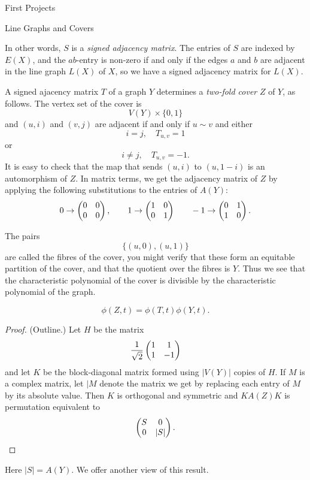 \begin{chap}{First Projects}
\begin{sect}{Line Graphs and Covers}
\begin{para}
In other words, $S$ is a \textsl{signed adjacency matrix}. The entries of
$S$ are indexed by $E(X)$, and the $ab$-entry is non-zero if and only if
the edges $a$ and $b$ are adjacent in the line graph $L(X)$ of $X$,
so we have a signed adjacency matrix for $L(X)$.
\end{para}
%
\begin{para}
A signed ajacency matrix $T$ of a graph $Y$ determines a \textsl{two-fold cover} $Z$
of $Y$, as follows. The vertex set of the cover is
\[
    V(Y) \times \{0,1\}
\]
and $(u,i)$ and $(v,j)$ are adjacent if and only if $u\sim v$ and either
\[
    i=j,\quad T_{u,v}=1
\]
or
\[
    i\ne j,\quad T_{u,v}=-1.
\]
It is easy to check that the map that sends $(u,i)$ to $(u,1-i)$ is an automorphism
of $Z$. In matrix terms, we get the adjacency matrix of $Z$ by applying
the following substitutions to the entries of $A(Y)$:
\[
    0\to\begin{pmatrix} 0&0\\0&0 \end{pmatrix},\qquad 1\to\begin{pmatrix} 1&0\\0&1 \end{pmatrix}
        \qquad -1\to\begin{pmatrix} 0&1\\1&0 \end{pmatrix}.
\]
\end{para}
%
\begin{para}
The pairs 
\[
    \{(u,0),(u,1)\}
\]
are called the fibres of the cover, you might verify that these form an equitable
partition of the cover, and that the quotient over the fibres is $Y$. Thus
we see that the characteristic polynomial of the cover is divisible
by the characteristic polynomial of the graph.
\end{para}
%
\begin{para}
%
\begin{lemma}
\begin{statement}
\[
        \phi(Z,t) =\phi(T,t)\phi(Y,t).
\]
\end{statement}    
\begin{proof}
(Outline.) Let $H$ be the matrix
\[
    \frac{1}{\sqrt{2}} \begin{pmatrix} 1&1\\1&-1 \end{pmatrix}
\]
and let $K$ be the block-diagonal matrix formed using $|V(Y)|$ copies of $H$.
If $M$ is a complex matrix, let $|M$ denote the matrix we get by replacing each entry
of $M$ by its absolute value.
Then $K$ is orthogonal and symmetric and $KA(Z)K$ is permutation equivalent to 
\[
    \begin{pmatrix} S&0\\0&|S| \end{pmatrix}.
\]
\end{proof}
\end{lemma}
\end{para}
%
\begin{para}
Here $|S|=A(Y)$. We offer another view of this result.

\end{para}
\end{sect}
\end{chap}
